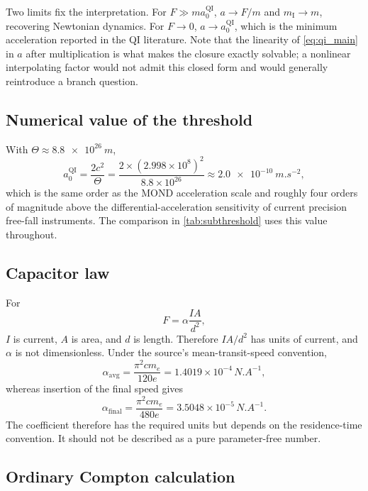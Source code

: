 \documentclass[11pt]{article}
\newcommand{\QI}{\mathrm{QI}}
\begin{document}
Two limits fix the interpretation. For \(F\gg ma_{0}^{\QI}\), \(a\to F/m\) and \(m_{\mathrm I}\to m\), recovering Newtonian dynamics. For \(F\to0\), \(a\to a_{0}^{\QI}\), which is the minimum acceleration reported in the QI literature. Note that the linearity of \cref{eq:qi_main} in \(a\) after multiplication is what makes the closure exactly solvable; a nonlinear interpolating factor would not admit this closed form and would generally reintroduce a branch question.

\subsection{Numerical value of the threshold}

With \(\Theta\approx\SI{8.8e26}{m}\),
\begin{equation}
    a_{0}^{\QI}
    =\frac{2c^{2}}{\Theta}
    =\frac{2\times(2.998\times10^{8})^{2}}{8.8\times10^{26}}
    \approx\SI{2.0e-10}{m.s^{-2}},
\end{equation}
which is the same order as the MOND acceleration scale and roughly four orders of magnitude above the differential-acceleration sensitivity of current precision free-fall instruments. The comparison in \cref{tab:subthreshold} uses this value throughout.

\subsection{Capacitor law}

For
\begin{equation}
    F=\alpha\frac{IA}{d^{2}},
\end{equation}
\(I\) is current, \(A\) is area, and \(d\) is length. Therefore \(IA/d^{2}\) has units of current, and \(\alpha\) is not dimensionless. Under the source's mean-transit-speed convention,
\begin{equation}
    \alpha_{\mathrm{avg}}
    =\frac{\pi^{2}cm_e}{120e}
    =1.4019\times10^{-4}\,\si{N.A^{-1}},
\end{equation}
whereas insertion of the final speed gives
\begin{equation}
    \alpha_{\mathrm{final}}
    =\frac{\pi^{2}cm_e}{480e}
    =3.5048\times10^{-5}\,\si{N.A^{-1}}.
\end{equation}
The coefficient therefore has the required units but depends on the residence-time convention. It should not be described as a pure parameter-free number.

\subsection{Ordinary Compton calculation}
\end{document}
